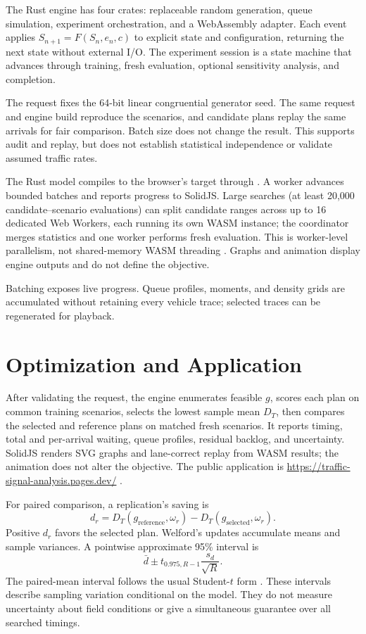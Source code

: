 \documentclass[12pt,a4paper]{report}
\begin{document}
The Rust engine has four crates: replaceable random generation, queue simulation, experiment orchestration, and a WebAssembly adapter. Each event applies $S_{n+1}=F(S_n,e_n,c)$ to explicit state and configuration, returning the next state without external I/O. The experiment session is a state machine that advances through training, fresh evaluation, optional sensitivity analysis, and completion.

The request fixes the 64-bit linear congruential generator seed. The same request and engine build reproduce the scenarios, and candidate plans replay the same arrivals for fair comparison. Batch size does not change the result. This supports audit and replay, but does not establish statistical independence or validate assumed traffic rates.

The Rust model compiles to the browser's  target through  \cite{rust-wasm,wasm-bindgen}. A worker advances bounded batches and reports progress to SolidJS. Large searches (at least 20,000 candidate--scenario evaluations) can split candidate ranges across up to 16 dedicated Web Workers, each running its own WASM instance; the coordinator merges statistics and one worker performs fresh evaluation. This is worker-level parallelism, not shared-memory WASM threading \cite{html-workers}. Graphs and animation display engine outputs and do not define the objective.

Batching exposes live progress. Queue profiles, moments, and density grids are accumulated without retaining every vehicle trace; selected traces can be regenerated for playback.

\section{Optimization and Application}
After validating the request, the engine enumerates feasible $g$, scores each plan on common training scenarios, selects the lowest sample mean $D_T$, then compares the selected and reference plans on matched fresh scenarios. It reports timing, total and per-arrival waiting, queue profiles, residual backlog, and uncertainty. SolidJS renders SVG graphs and lane-correct replay from WASM results; the animation does not alter the objective. The public application is \url{https://traffic-signal-analysis.pages.dev/} \cite{web}.

For paired comparison, a replication's saving is
\begin{equation}
d_r=D_T(g_{\mathrm{reference}},\omega_r)-D_T(g_{\mathrm{selected}},\omega_r).
\end{equation}
Positive $d_r$ favors the selected plan. Welford's updates accumulate means and sample variances. A pointwise approximate 95\% interval is
\begin{equation}
\bar d\pm t_{0.975,R-1}\frac{s_d}{\sqrt R}.
\end{equation}
The paired-mean interval follows the usual Student-$t$ form \cite{taha}. These intervals describe sampling variation conditional on the model. They do not measure uncertainty about field conditions or give a simultaneous guarantee over all searched timings.
\end{document}

